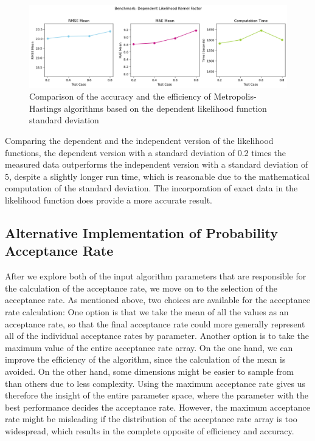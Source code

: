 \begin{figure}[H]
    \centering
    \includegraphics[width=1\textwidth]{figures/basic_mh/benchmark/sensitivity_likelihood_dependent.png}
    \captionsetup{width=.8\textwidth}
    \caption{Comparison of the accuracy and the efficiency of Metropolis-Hastings algorithms based on the dependent likelihood function standard deviation}
    \label{fig:enter-label}
\end{figure}


Comparing the dependent and the independent version of the likelihood functions, the dependent version with a standard deviation of $0.2$ times the measured data outperforms the independent version with a standard deviation of $5$, despite a slightly longer run time, which is reasonable due to the mathematical computation of the standard deviation. The incorporation of exact data in the likelihood function does provide a more accurate result.

\subsection{Alternative Implementation of Probability Acceptance Rate}
After we explore both of the input algorithm parameters that are responsible for the calculation of the acceptance rate, we move on to the selection of the acceptance rate. As mentioned above, two choices are available for the acceptance rate calculation: One option is that we take the mean of all the values as an acceptance rate, so that the final acceptance rate could more generally represent all of the individual acceptance rates by parameter. Another option is to take the maximum value of the entire acceptance rate array. On the one hand, we can improve the efficiency of the algorithm, since the calculation of the mean is avoided. On the other hand, some dimensions might be easier to sample from than others due to less complexity. Using the maximum acceptance rate gives us therefore the insight of the entire parameter space, where the parameter with the best performance decides the acceptance rate. However, the maximum acceptance rate might be misleading if the distribution of the acceptance rate array is too widespread, which results in the complete opposite of efficiency and accuracy.

